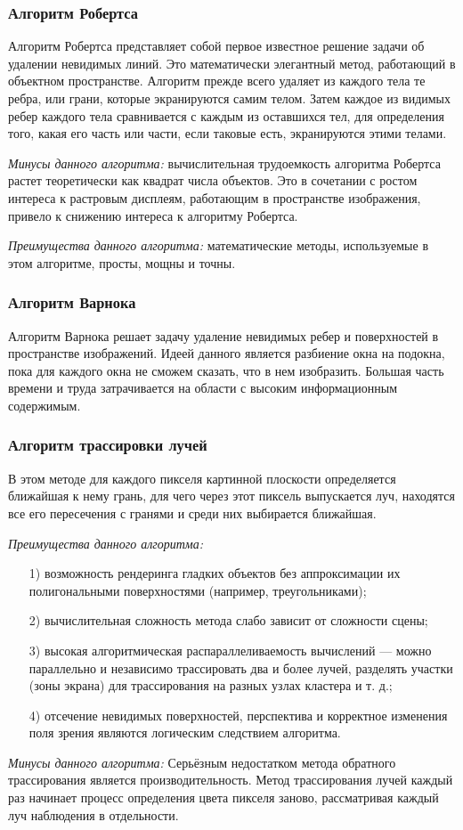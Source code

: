 \documentclass[14pt, a4paper]{extarticle}
\begin{document}
\subsubsection{Алгоритм Робертса}
Алгоритм Робертса представляет собой первое известное решение задачи об удалении невидимых линий. Это математически элегантный метод, работающий в объектном пространстве. Алгоритм прежде всего удаляет из каждого тела те ребра, или грани, которые экранируются самим телом. Затем каждое из видимых ребер каждого тела сравнивается с каждым из оставшихся тел, для определения того, какая его часть или части, если таковые есть, экранируются этими телами.\par
\textit{Минусы данного алгоритма:} вычислительная трудоемкость алгоритма Робертса растет теоретически как квадрат числа объектов. Это в сочетании с ростом интереса к растровым дисплеям, работающим в пространстве изображения, привело к снижению интереса к алгоритму Робертса.\par
\textit{Преимущества данного алгоритма:} математические методы, используемые в этом алгоритме, просты, мощны и точны.
\subsubsection{Алгоритм Варнока} 
Алгоритм Варнока решает задачу удаление невидимых ребер и поверхностей в пространстве изображений. Идеей данного является разбиение окна на подокна, пока для каждого окна не сможем сказать, что в нем изобразить. Большая часть времени и труда затрачивается на области с высоким информационным содержимым.
\subsubsection{Алгоритм трассировки лучей}
В этом методе для каждого пикселя картинной плоскости определяется ближайшая к нему грань, для чего через этот пиксель выпускается луч, находятся все его пересечения с гранями и среди них выбирается ближайшая.\par
\textit{Преимущества данного алгоритма:}
\begin{enumerate}
	\item[1)] возможность рендеринга гладких объектов без аппроксимации их полигональными поверхностями (например, треугольниками);
	\item[2)] вычислительная сложность метода слабо зависит от сложности сцены;
	\item[3)] высокая алгоритмическая распараллеливаемость вычислений — можно параллельно и независимо трассировать два и более лучей, разделять участки (зоны экрана) для трассирования на разных узлах кластера и т. д.;
	\item[4)] отсечение невидимых поверхностей, перспектива и корректное изменения поля зрения являются логическим следствием алгоритма.
\end{enumerate}
\textit{Минусы данного алгоритма:} Серьёзным недостатком метода обратного трассирования является производительность. Метод трассирования лучей каждый раз начинает процесс определения цвета пикселя заново, рассматривая каждый луч наблюдения в отдельности. 
\end{document}
